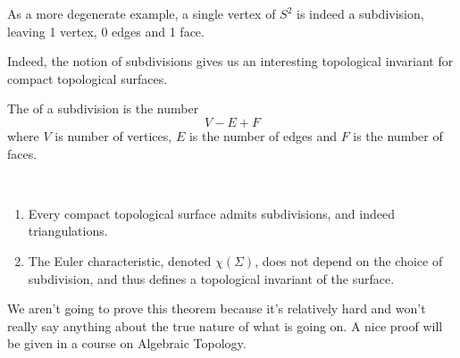 \documentclass[a4paper]{scrartcl}
\begin{document}
\begin{example}
\begin{center}

\end{center}

As a more degenerate example, a single vertex of $S^2$ is indeed a subdivision, leaving 1 vertex, 0 edges and 1 face.
\end{example}

Indeed, the notion of subdivisions gives us an interesting topological invariant for compact topological surfaces.

\begin{definition}
    The  of a subdivision is the number 
    $$
    V - E + F
    $$
    where $V$ is number of vertices, $E$ is the number of edges and $F$ is the number of faces.
\end{definition}

\begin{theorem}~
    \vspace*{-1.5\baselineskip}
\begin{enumerate}[label=(\roman*)]
    \item Every compact topological surface admits subdivisions, and indeed triangulations.
    \item The Euler characteristic, denoted $\chi(\Sigma)$, does not depend on the choice of subdivision, and thus defines a topological invariant of the surface.
\end{enumerate}
\end{theorem}

We aren't going to prove this theorem because it's relatively hard and won't really say anything about the true nature of what is going on.
A nice proof will be given in a course on Algebraic Topology.
\end{document}
